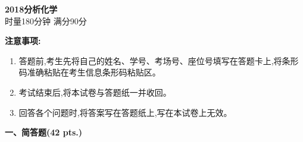 \begin{center}
    {\LARGE \textbf{2018分析化学}} \\[2ex]
    {\large 时量180分钟 \quad 满分90分}
\end{center}

\vspace{0.5cm}
\noindent\textbf{注意事项:}
\begin{enumerate}[label=\arabic*., parsep=0pt, itemsep=0pt]
    \item 答题前,考生先将自己的姓名、学号、考场号、座位号填写在答题卡上,将条形码准确粘贴在考生信息条形码粘贴区。
    \item 考试结束后,将本试卷与答题纸一并收回。
    \item 回答各个问题时,将答案写在答题纸上,写在本试卷上无效。
\end{enumerate}

\vspace{0.5cm}
\noindent\textbf{一、简答题(42 pts.)}

